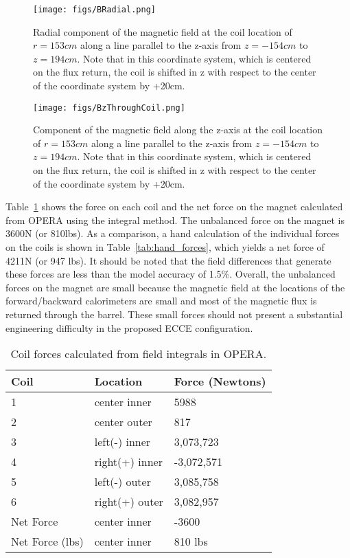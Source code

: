 \begin{figure}[h!tbp]
    \centering
    \texttt{[image: figs/BRadial.png]}
    \caption{Radial component of the magnetic field at the coil location of $r=153cm$ along a line parallel to the z-axis from $z=-154cm$ to $z=194cm$. Note that in this coordinate system, which is centered on the flux return, the coil is shifted in z with respect to the center of the coordinate system by +20cm.}
    \label{fig:BRadial}
\end{figure}

\begin{figure}[h!tbp]
    \centering
    \texttt{[image: figs/BzThroughCoil.png]}
    \caption{Component of the magnetic field along the z-axis at the coil location of $r=153cm$ along a line parallel to the z-axis from $z=-154cm$ to $z=194cm$. Note that in this coordinate system, which is centered on the flux return, the coil is shifted in z with respect to the center of the coordinate system by +20cm.}
    \label{fig:BzThroughCoil}
\end{figure}

Table~\ref{tab:opera_forces} shows the force on each coil and the net force on the magnet calculated from OPERA using the integral method.  The unbalanced force on the magnet is 3600N (or 810lbs).  As a comparison, a hand calculation of the individual forces on the coils is shown in Table~\ref{tab:hand_forces}, which yields a net force of 4211N (or 947 lbs).  It should be noted that the field differences that generate these forces are less than the model accuracy of 1.5\%. Overall, the unbalanced forces on the magnet are small because the magnetic field at the locations of the forward/backward calorimeters are small and most of the magnetic flux is returned through the barrel.  These small forces should not present a substantial engineering difficulty in the proposed ECCE configuration. 

\begin{table}
\centering
\begin{tabular}{lll}
\hline
Coil & Location & Force (Newtons) \\
\hline
1 & center inner & 5988 \\
2 & center outer & 817 \\
3 & left(-) inner & 3,073,723 \\
4 & right(+) inner & -3,072,571 \\
5 & left(-) outer & 3,085,758 \\
6 & right(+) outer & 3,082,957 \\
Net Force & center inner & -3600 \\
Net Force (lbs) & center inner & 810 lbs \\
\hline
\end{tabular}
\caption{Coil forces calculated from field integrals in OPERA.}
\label{tab:opera_forces}
\end{table}

